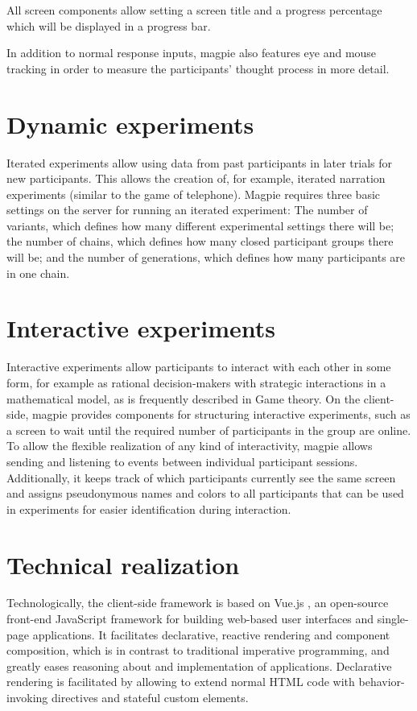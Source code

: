 \documentclass[a4paper,11pt]{scrreprt}
\begin{document}
All screen components allow setting a screen title and a progress percentage which will be displayed in a progress bar.

In addition to normal response inputs, magpie also features eye and mouse tracking in order to measure the participants' thought process in more detail.

\section{Dynamic experiments}
Iterated experiments allow using data from past participants in later trials for new participants. This allows the creation of, for example, iterated narration experiments (similar to the game of telephone).
Magpie requires three basic settings on the server for running an iterated experiment: The number of variants, which defines how many different experimental settings there will be; the number of chains, which defines how many closed participant groups there will be; and the number of generations, which defines how many participants are in one chain.

\section{Interactive experiments}
Interactive experiments allow participants to interact with each other in some form, for example as rational decision-makers with strategic interactions in a mathematical model, as is frequently described in Game theory. On the client-side, magpie provides components for structuring interactive experiments, such as a screen to wait until the required number of participants in the group are online. To allow the flexible realization of any kind of interactivity, magpie allows sending and listening to events between individual participant sessions. Additionally, it keeps track of which participants currently see the same screen and assigns pseudonymous names and colors to all participants that can be used in experiments for easier identification during interaction.

\section{Technical realization}
Technologically, the client-side framework is based on Vue.js \citep{You2014}, an open-source front-end JavaScript framework for building web-based user interfaces and single-page applications. It facilitates declarative, reactive rendering and component composition, which is in contrast to traditional imperative programming, and greatly eases reasoning about and implementation of applications. Declarative rendering is facilitated by allowing to extend normal HTML code with behavior-invoking directives and stateful custom elements.
\end{document}
